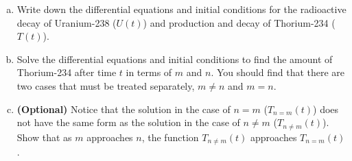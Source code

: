 \documentclass[11pt]{article}
\begin{document}
\begin{enumerate}[(a)]
  \item Write down the differential equations and initial conditions for the radioactive decay of Uranium-238 ($U(t)$) and production and decay of Thorium-234 ($T(t)$).
  \vspace{3cm}
  \item Solve the differential equations and initial conditions to find the amount of Thorium-234 after time $t$ in terms of $m$ and $n$. You should find that there are two cases that must be treated separately, $m \ne n$ and $m = n$.
  \vspace{7.5cm}
  \item \textbf{(Optional)} Notice that the solution in the case of $n = m$ ($T_{n = m}(t)$) does not have the same form as the solution in the case of $n \ne m$ ($T_{n \ne m}(t)$). Show that as $m$ approaches $n$, the function $T_{n \ne m}(t)$ approaches $T_{n = m}(t)$.
\end{enumerate}
\end{document}
